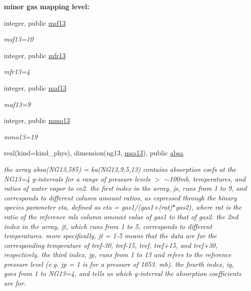 \begin{Indent}\textbf{ minor gas mapping level\+:}\par
\begin{DoxyCompactItemize}
\item 
integer, public \hyperlink{group__module__radlw__kgbnn_ga7f88590d2a9fc392b04e89fd3d4bf2bf}{msf13}
\begin{DoxyCompactList}\small\item\em msf13=10 \end{DoxyCompactList}\item 
integer, public \hyperlink{group__module__radlw__kgbnn_ga158782c955af9f50aaefea2d49af97ce}{mfr13}
\begin{DoxyCompactList}\small\item\em mfr13=4 \end{DoxyCompactList}\item 
integer, public \hyperlink{group__module__radlw__kgbnn_ga1ddc025df872b12194b8c6344cc0204e}{maf13}
\begin{DoxyCompactList}\small\item\em maf13=9 \end{DoxyCompactList}\item 
integer, public \hyperlink{group__module__radlw__kgbnn_gae513ce55829a57a0dbda77f570e4a619}{mmo13}
\begin{DoxyCompactList}\small\item\em mmo13=19 \end{DoxyCompactList}\item 
real(kind=kind\+\_\+phys), dimension(ng13, \hyperlink{namespacemodule__radlw__kgb13_a07932a22e5f8de248765a207e170ce6f}{msa13}), public \hyperlink{group__module__radlw__kgbnn_ga22ce8d48ac3dceae1d52e80097fc2689}{absa}
\begin{DoxyCompactList}\small\item\em the array absa(\+N\+G13,585) = ka(\+N\+G13,9,5,13) contains absorption coefs at the N\+G13=4 g-\/intervals for a range of pressure levels $>$ $\sim$100mb, temperatures, and ratios of water vapor to co2. the first index in the array, js, runs from 1 to 9, and corresponds to different column amount ratios, as expressed through the binary species parameter eta, defined as eta = gas1/(gas1+(rat)$\ast$gas2), where rat is the ratio of the reference mls column amount value of gas1 to that of gas2. the 2nd index in the array, jt, which runs from 1 to 5, corresponds to different temperatures. more specifically, jt = 1-\/5 means that the data are for the corresponding temperature of tref-\/30, tref-\/15, tref, tref+15, and tref+30, respectively. the third index, jp, runs from 1 to 13 and refers to the reference pressure level (e.\+g. jp = 1 is for a pressure of 1053. mb). the fourth index, ig, goes from 1 to N\+G13=4, and tells us which g-\/interval the absorption coefficients are for. \end{DoxyCompactList}\item 

\end{DoxyCompactItemize}
\end{Indent}

